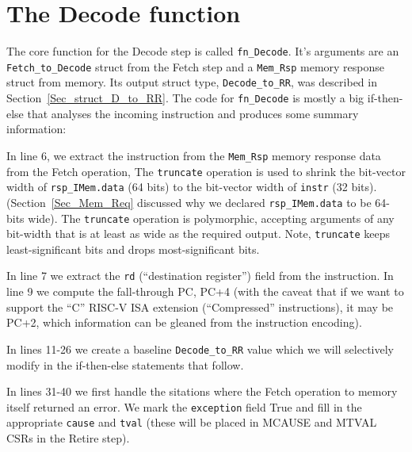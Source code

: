 \Endexercise


\section{The Decode function}

\label{Sec_Decode_Function}


The core function for the Decode step is called \verb|fn_Decode|.
It's arguments are an \verb|Fetch_to_Decode| struct from the Fetch
step and a \verb|Mem_Rsp| memory response struct from memory.  Its
output struct type, \verb|Decode_to_RR|, was described in
Section~\ref{Sec_struct_D_to_RR}.  The code for \verb|fn_Decode| is
mostly a big if-then-else that analyses the incoming instruction and
produces some summary information:




In line 6, we extract the instruction from the \verb|Mem_Rsp| memory
response data from the Fetch operation, The \verb|truncate| operation
is used to shrink the bit-vector width of \verb|rsp_IMem.data| (64
bits) to the bit-vector width of \verb|instr| (32 bits).
(Section~\ref{Sec_Mem_Req} discussed why we declared
\verb|rsp_IMem.data| to be 64-bits wide).  The \verb|truncate|
operation is polymorphic, accepting arguments of any bit-width that is
at least as wide as the required output.  Note, \verb|truncate| keeps
least-significant bits and drops most-significant bits.

In line 7 we extract the \verb|rd| (``destination register'') field
from the instruction.  In line 9 we compute the fall-through PC, PC+4
(with the caveat that if we want to support the ``C'' RISC-V ISA
extension (``Compressed'' instructions), it may be PC+2, which
information can be gleaned from the instruction encoding).

In lines 11-26 we create a baseline \verb|Decode_to_RR| value which we
will selectively modify in the if-then-else statements that follow.

In lines 31-40 we first handle the sitations where the Fetch operation
to memory itself returned an error.  We mark the \verb|exception|
field True and fill in the appropriate \verb|cause| and \verb|tval|
(these will be placed in MCAUSE and MTVAL CSRs in the Retire step).

